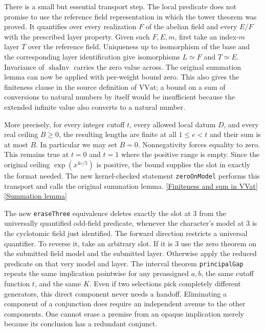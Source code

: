 \documentclass[12pt,letterpaper]{article}
\begin{document}
There is a small but essential transport step. The local predicate does not promise to use the reference field representation in which the tower theorem was proved. It quantifies over every realization \(F\) of the abelian field and every \(E/F\) with the prescribed layer property. Given such \(F,E,m\), first take an index-\(m\) layer \(T\) over the reference field. Uniqueness up to isomorphism of the base and the corresponding layer identification give isomorphisms \(L\simeq F\) and \(T\simeq E\). Invariance of \(\operatorname{shaInv}\) carries the zero value across. The original summation lemma can now be applied with per-weight bound zero. This also gives the finiteness clause in the source definition of \(\mathrm{VVat}\); a bound on a sum of conversions to natural numbers by itself would be insufficient because the extended infinite value also converts to a natural number.

More precisely, for every integer cutoff \(t\), every allowed local datum \(D\), and every real ceiling \(B\ge0\), the resulting lengths are finite at all \(1\le e<t\) and their sum is at most \(B\). In particular we may set \(B=0\). Nonnegativity forces equality to zero. This remains true at \(t=0\) and \(t=1\) where the positive range is empty. Since the original ceiling \(\exp(x^{4\varepsilon/5})\) is positive, the bound supplies the slot in exactly the format needed. The new kernel-checked statement \texttt{zeroOnModel} performs this transport and calls the original summation lemma. \href{https://github.com/nousentllc/riemann-hypothesis/blob/40e56bab026552e089d7afcfeff08d2defb9c005/src/Development/AutomorphicArithmetic/AutomorphicVarieties/LengthEqAddEigen.lean#L107-L110}{[Finiteness and sum in VVat]}\quad\href{https://github.com/nousentllc/riemann-hypothesis/blob/40e56bab026552e089d7afcfeff08d2defb9c005/src/Development/AutomorphicArithmetic/AutomorphicVarieties/LayeredIsomorphisms/Vvat.lean}{[Summation lemma]}

The new \texttt{eraseThree} equivalence deletes exactly the slot at 3 from the universally quantified odd-field predicate, whenever the character's model at 3 is the cyclotomic field just identified. The forward direction restricts a universal quantifier. To reverse it, take an arbitrary slot. If it is 3 use the zero theorem on the submitted field model and the submitted layer. Otherwise apply the reduced predicate on that very model and layer. The interval theorem \texttt{principalGap} repeats the same implication pointwise for any preassigned \(a,b\), the same cutoff function \(t\), and the same \(K\). Even if two selections pick completely different generators, this direct component never needs a handoff. Eliminating a component of a conjunction does require an independent avenue to the other components. One cannot erase a premise from an opaque implication merely because its conclusion has a redundant conjunct.
\end{document}
